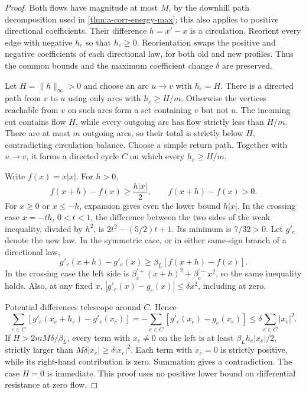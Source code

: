 \begin{proof}
Both flows have magnitude at most $M$, by the downhill path decomposition
used in \cref{thm:a-corr-energy-max}; this also applies to positive
directional coefficients. Their difference $h=x'-x$ is a circulation.
Reorient every edge with negative $h_e$ so that $h_e\ge0$. Reorientation
swaps the positive and negative coefficients of each directional law,
for both old and new profiles. Thus the common bounds and the maximum
coefficient change $\delta$ are preserved.

Let $H=\|h\|_\infty>0$ and choose an arc $u\to v$ with $h_e=H$.
There is a directed path from $v$ to $u$ using only arcs with
$h_e\ge H/m$. Otherwise the vertices reachable from $v$ on such arcs
form a set containing $v$ but not $u$. The incoming cut contains flow
$H$, while every outgoing arc has flow strictly less than $H/m$.
There are at most $m$ outgoing arcs, so their total is strictly below
$H$, contradicting circulation balance. Choose a simple return path.
Together with $u\to v$, it forms a directed cycle $C$ on which every
$h_e\ge H/m$.

Write $f(x)=x|x|$. For $h>0$,
\begin{equation}
 f(x+h)-f(x)\ge\frac{h|x|}{2},
 \qquad f(x+h)-f(x)>0.
 \label{eq:a-corr-scalar}
\end{equation}
For $x\ge0$ or $x\le-h$, expansion gives even the lower bound
$h|x|$. In the crossing case $x=-th$, $0<t<1$, the difference between
the two sides of the weak inequality, divided by $h^2$, is
$2t^2-(5/2)t+1$. Its minimum is $7/32>0$.
Let $g'_e$ denote the new law. In the symmetric case, or in either
same-sign branch of a directional law,
\[
 g'_e(x+h)-g'_e(x)\ge\beta_L[f(x+h)-f(x)].
\]
In the crossing case the left side is
$\beta_e^{\prime+}(x+h)^2+\beta_e^{\prime-}x^2$, so the same inequality
holds. Also, at any fixed $x$,
$|g'_e(x)-g_e(x)|\le\delta x^2$, including at zero.

Potential differences telescope around $C$. Hence
\[
 \sum_{e\in C}[g'_e(x_e+h_e)-g'_e(x_e)]
 =-\sum_{e\in C}[g'_e(x_e)-g_e(x_e)]
 \le\delta\sum_{e\in C}|x_e|^2.
\]
If $H>2mM\delta/\beta_L$, every term with $x_e\ne0$ on the left
is at least $\beta_L h_e|x_e|/2$, strictly larger than
$M\delta|x_e|\ge\delta|x_e|^2$. Each term with $x_e=0$ is strictly
positive, while its right-hand contribution is zero. Summation gives a
contradiction. The case $H=0$ is immediate. This proof uses no positive
lower bound on differential resistance at zero flow.
\end{proof}

